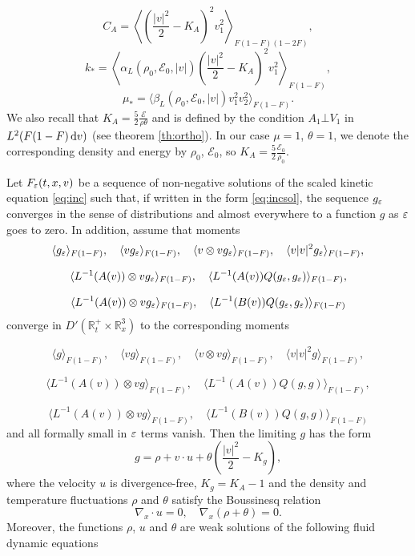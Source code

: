 \[C_A=  \left\langle   \left(\frac{|v|^2}{2}-K_A\right)^2 v_1^2
\right\rangle_{F(1-F)(1-2F)},\]
\[k_\ast=\left\langle \alpha_L(\rho_0,\mathcal E_0,|v|) \left( \frac{|v|^2}{2}-K_A\right)^2v_1^2  
\right\rangle_{F(1-F)},\]
\[\mu_\ast=\langle \beta_L(\rho_0,\mathcal E_0,|v|) v_1^2v_2^2
\rangle_{F(1-F)}.\]
We also recall  that $K_A=\frac 52\frac{\mathcal E}{\rho\theta}$ and is defined by the condition $A_1\bot V_1$ in $L^2(F(1-F){\,\mathrm{d} v})$ (see theorem \ref{th:ortho}). In our case $\mu=1$, $\theta=1$, we denote the corresponding density and energy by $\rho_0$, $\mathcal E_0$, so $K_A=\frac 52\frac{\mathcal E_0}{\rho_0}$.
\begin{theorem}\label{th:INSE}
 Let $F_{\varepsilon}(t,x,v)$ be a sequence of non-negative solutions of the scaled
kinetic equation \eqref{eq:inc} such that, if written in the form \eqref{eq:incsol}, the sequence
$g_{\varepsilon}$ converges in the sense of distributions and almost everywhere to
a function $g$ as ${\varepsilon}$ goes to zero. In addition, assume that
moments
\[\langle g_{\varepsilon}\rangle_{F(1-F)},\quad \langle
vg_{\varepsilon}\rangle_{F(1-F)},\quad \langle v\otimes v g_{\varepsilon}\rangle_{F(1-F)},\quad\langle v|v|^2
g_{\varepsilon}\rangle_{F(1-F)},\]

\[\langle L^{-1}(A(v))\otimes vg_{\varepsilon}\rangle_{F(1-F)},\quad \langle
L^{-1}(A(v))Q(g_{\varepsilon},g_{\varepsilon})\rangle_{F(1-F)},\]

\[\langle L^{-1}(A(v))\otimes vg_{\varepsilon}\rangle_{F(1-F)},\quad \langle
L^{-1}(B(v))Q(g_{\varepsilon},g_{\varepsilon})\rangle_{F(1-F)}\]
converge in $D'(\mathbb R^+_t\times\mathbb R^3_x)$ to the corresponding moments

\[\langle g\rangle_{F(1-F)},\quad \langle vg\rangle_{F(1-F)},\quad \langle v\otimes v g\rangle_{F(1-F)},\quad \langle
v|v|^2 g\rangle_{F(1-F)},\]

\[\langle L^{-1}(A(v))\otimes vg\rangle_{F(1-F)},\quad \langle
L^{-1}(A(v))Q(g,g)\rangle_{F(1-F)},\]

\[\langle L^{-1}(A(v))\otimes vg\rangle_{F(1-F)},\quad \langle
L^{-1}(B(v))Q(g,g)\rangle_{F(1-F)}\]
and all formally small in ${\varepsilon}$ terms vanish. Then the limiting $g$ has
the form
\begin{equation}
 g=\rho+v\cdot u +\theta \left(\frac{|v|^2}{2}-K_g\right), \label{eq:incg}
\end{equation}
where the  velocity $u$ is divergence-free, $K_g=K_A -1$ and the density and 
temperature
fluctuations $\rho$ and $\theta$ satisfy the Boussinesq relation
\begin{equation}
 \nabla_x\cdot u =0,\quad \nabla_x(\rho+\theta)=0.\label{eq:incBouss}
\end{equation}
Moreover, the functions $\rho$, $u$ and $\theta$ are weak solutions of the following fluid dynamic
equations


\end{theorem}
